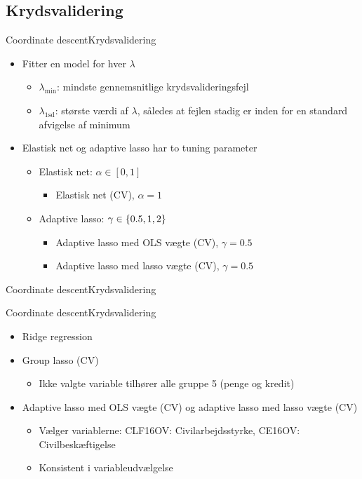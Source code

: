 \subsection{Krydsvalidering}
\begin{frame}{Coordinate descent}{Krydsvalidering}
\begin{itemize}
\item Fitter en model for hver $\lambda$
\begin{itemize}
\item $\lambda_{\min}$: mindste gennemsnitlige krydsvalideringsfejl
\item $\lambda_{1\text{sd}}$: største værdi af $\lambda$, således at fejlen stadig er inden for en standard afvigelse af minimum 
\end{itemize}
\item Elastisk net og adaptive lasso har to tuning parameter
\begin{itemize}
\item Elastisk net: $\alpha \in [0,1]$ 
\begin{itemize}
\item Elastisk net (CV), $\alpha = 1$
\end{itemize}
\item Adaptive lasso: $\gamma \in \cbr{0.5, 1, 2}$
\begin{itemize}
\item Adaptive lasso med OLS vægte (CV), $\gamma = 0.5$
\item Adaptive lasso med lasso vægte (CV), $\gamma = 0.5$
\end{itemize}
\end{itemize}
\end{itemize}
\end{frame}

\begin{frame}{Coordinate descent}{Krydsvalidering}

\end{frame}


\begin{frame}{Coordinate descent}{Krydsvalidering}
\begin{itemize}
\item Ridge regression
\item Group lasso (CV)
\begin{itemize}
\item Ikke valgte variable tilhører alle gruppe 5 (penge og kredit)
\end{itemize}
\item Adaptive lasso med OLS vægte (CV) og adaptive lasso med lasso vægte (CV)
\begin{itemize}
\item Vælger variablerne: \textcolor{blue3}{CLF16OV}: Civilarbejdsstyrke,   \textcolor{blue3}{CE16OV}: Civilbeskæftigelse   
\item Konsistent i variableudvælgelse
\end{itemize}
\end{itemize}
\end{frame}


